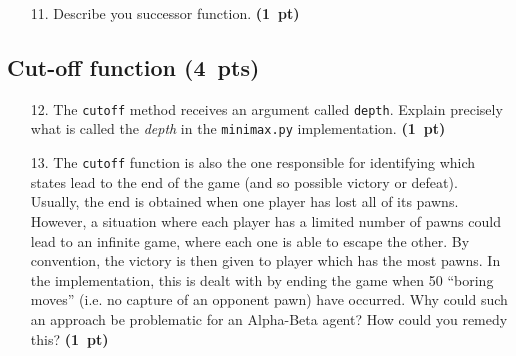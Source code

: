 \documentclass[11pt,a4paper]{report}
\begin{document}
\begin{enumerate}
\item[11.] Describe you successor function. \textbf{(1~pt)}
\end{enumerate}

\begin{answers}[9cm]
\end{answers}





\clearpage
\subsection{Cut-off function (4~pts)}


\begin{enumerate}
\item[12.] The \lstinline|cutoff| method receives an argument called
    \lstinline|depth|. Explain precisely what is called the
    \emph{depth} in the \lstinline|minimax.py| implementation. \textbf{(1~pt)}
\end{enumerate}

\begin{answers}[6cm]
\end{answers}





\begin{enumerate}
\item[13.] The \lstinline|cutoff| function is also the one responsible for identifying which states lead to the end of the game (and so possible victory or defeat). Usually, the end is obtained when one player has lost all of its pawns. However, a situation where each player has a limited number of pawns could lead to an infinite game, where each one is able to escape the other. By convention, the victory is then given to player which has the most pawns. In the implementation, this is dealt with by ending the game when 50 ``boring moves'' (i.e.\! no capture of an opponent pawn) have occurred. Why could such an approach be problematic for an Alpha-Beta agent? How could you remedy this? \textbf{(1~pt)}
\end{enumerate}

\begin{answers}[10cm]
\end{answers}
\end{document}
